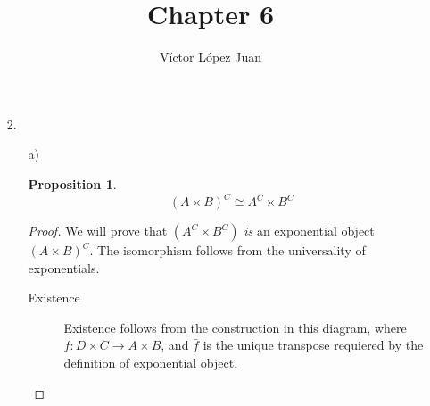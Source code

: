 \documentclass[a4paper,notitlepage]{article}
\author{Víctor López Juan}
\title{Chapter 6}
\newtheorem{proposition}{Proposition}
\begin{document}
\maketitle

\begin{enumerate}
     
   \item[ 2.]

     \begin{enumerate}

       \item[a)]

         \begin{proposition}
           
         $$(A \times B)^C \cong A^C \times B^C$$

         \end{proposition}

         \begin{proof}

           We will prove that $(A^C \times B^C)$ {\em is} an exponential
           object $(A \times B)^C$. The isomorphism follows from the
           universality of exponentials.

           \begin{description}
             
             \item[Existence]
               
               Existence follows from the construction in this
               diagram, where $f : D \times C → A \times B$, and
               $\bar{f}$ is the unique transpose requiered by the definition
               of exponential object.

\end{description}
\end{proof}
\end{enumerate}
\end{enumerate}
\end{document}
